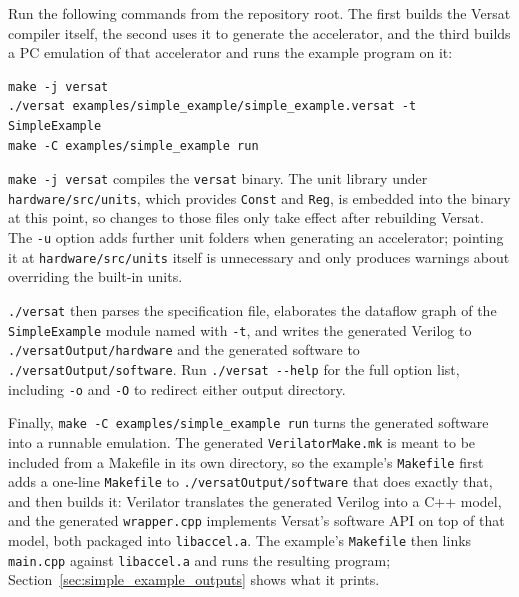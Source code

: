 %

Run the following commands from the repository root. The first builds the Versat compiler itself, the second uses it to generate the accelerator, and the third builds a PC emulation of that accelerator and runs the example program on it:

\begin{lstlisting}
make -j versat
./versat examples/simple_example/simple_example.versat -t SimpleExample
make -C examples/simple_example run
\end{lstlisting}

\texttt{make -j versat} compiles the \texttt{versat} binary. The unit library under \texttt{hardware/src/units}, which provides \texttt{Const} and \texttt{Reg}, is embedded into the binary at this point, so changes to those files only take effect after rebuilding Versat. The \texttt{-u} option adds further unit folders when generating an accelerator; pointing it at \texttt{hardware/src/units} itself is unnecessary and only produces warnings about overriding the built-in units.

\texttt{./versat} then parses the specification file, elaborates the dataflow graph of the \texttt{SimpleExample} module named with \texttt{-t}, and writes the generated Verilog to \texttt{./versatOutput/hardware} and the generated software to \texttt{./versatOutput/software}. Run \texttt{./versat -{}-help} for the full option list, including \texttt{-o} and \texttt{-O} to redirect either output directory.

Finally, \texttt{make -C examples/simple\_example run} turns the generated software into a runnable emulation. The generated \texttt{VerilatorMake.mk} is meant to be included from a Makefile in its own directory, so the example's \texttt{Makefile} first adds a one-line \texttt{Makefile} to \texttt{./versatOutput/software} that does exactly that, and then builds it: Verilator translates the generated Verilog into a C++ model, and the generated \texttt{wrapper.cpp} implements Versat's software API on top of that model, both packaged into \texttt{libaccel.a}. The example's \texttt{Makefile} then links \texttt{main.cpp} against \texttt{libaccel.a} and runs the resulting program; Section~\ref{sec:simple_example_outputs} shows what it prints.
